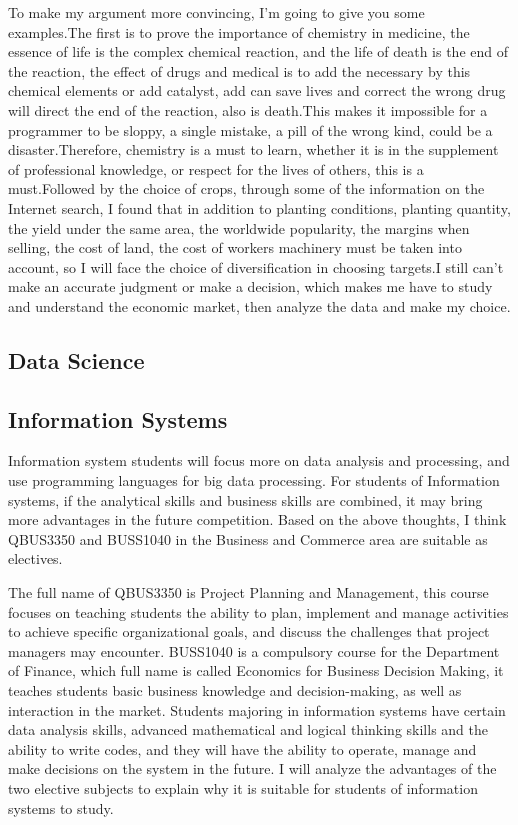 \documentclass[12pt]{article}
\begin{document}
To make my argument more convincing, I'm going to give you some examples.The first is to prove the importance of chemistry in medicine, the essence of life is the complex chemical reaction, and the life of death is the end of the reaction, the effect of drugs and medical is to add the necessary by this chemical elements or add catalyst, add can save lives and correct the wrong drug will direct the end of the reaction, also is death.This makes it impossible for a programmer to be sloppy, a single mistake, a pill of the wrong kind, could be a disaster.Therefore, chemistry is a must to learn, whether it is in the supplement of professional knowledge, or respect for the lives of others, this is a must.Followed by the choice of crops, through some of the information on the Internet search, I found that in addition to planting conditions, planting quantity, the yield under the same area, the worldwide popularity, the margins when selling, the cost of land, the cost of workers machinery must be taken into account, so I will face the choice of diversification in choosing targets.I still can't make an accurate judgment or make a decision, which makes me have to study and understand the economic market, then analyze the data and make my choice.

\newpage
\subsection{Data Science}

\newpage
\subsection{Information Systems}


Information system students will focus more on data analysis and processing, and use programming languages for big data processing. For students of Information systems, if the analytical skills and business skills are combined, it may bring more advantages in the future competition. Based on the above thoughts, I think QBUS3350 and BUSS1040 in the Business and Commerce area are suitable as electives.

The full name of QBUS3350 is Project Planning and Management, this course focuses on teaching students the ability to plan, implement and manage activities to achieve specific organizational goals, and discuss the challenges that project managers may encounter. BUSS1040 is a compulsory course for the Department of Finance, which full name is called Economics for Business Decision Making, it teaches students basic business knowledge and decision-making, as well as interaction in the market. Students majoring in information systems have certain data analysis skills, advanced mathematical and logical thinking skills and the ability to write codes, and they will have the ability to operate, manage and make decisions on the system in the future. I will analyze the advantages of the two elective subjects to explain why it is suitable for students of information systems to study.
\end{document}
